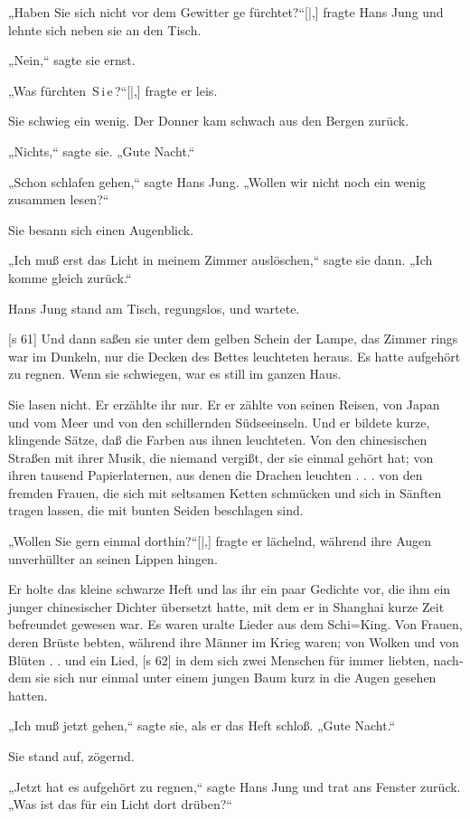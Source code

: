 „Haben Sie sich nicht vor dem Gewitter ge­
fürchtet?“[|,] fragte Hans Jung und lehnte sich neben
sie an den Tisch.

„Nein,“ sagte sie ernst.

„Was fürchten  S i e ?“[|,] fragte er leis.

Sie schwieg ein wenig. Der Donner kam schwach
aus den Bergen zurück.

„Nichts,“ sagte sie. „Gute Nacht.“

„Schon schlafen gehen,“ sagte Hans Jung.
„Wollen wir nicht noch ein wenig zusammen lesen?“

Sie besann sich einen Augenblick.

„Ich muß erst das Licht in meinem Zimmer
auslöschen,“ sagte sie dann. „Ich komme gleich
zurück.“

Hans Jung stand am Tisch, regungslos, und
wartete.

[s 61]
Und dann saßen sie unter dem gelben Schein
der Lampe, das Zimmer rings war im Dunkeln, nur
die Decken des Bettes leuchteten heraus. Es hatte
aufgehört zu regnen. Wenn sie schwiegen, war es
still im ganzen Haus.

Sie lasen nicht. Er erzählte ihr nur. Er er­
zählte von seinen Reisen, von Japan und vom Meer
und von den schillernden Südseeinseln. Und er
bildete kurze, klingende Sätze, daß die Farben aus
ihnen leuchteten. Von den chinesischen Straßen mit
ihrer Musik, die niemand vergißt, der sie einmal
gehört hat; von ihren tausend Papierlaternen, aus
denen die Drachen leuchten . . . von den fremden
Frauen, die sich mit seltsamen Ketten schmücken
und sich in Sänften tragen lassen, die mit bunten
Seiden beschlagen sind.

„Wollen Sie gern einmal dorthin?“[|,] fragte er
lächelnd, während ihre Augen unverhüllter an seinen
Lippen hingen.

Er holte das kleine schwarze Heft und las ihr
ein paar Gedichte vor, die ihm ein junger chinesischer
Dichter übersetzt hatte, mit dem er in Shanghai
kurze Zeit befreundet gewesen war. Es waren
uralte Lieder aus dem Schi=King. Von Frauen,
deren Brüste bebten, während ihre Männer im Krieg
waren; von Wolken und von Blüten . . und ein Lied,
[s 62]
in dem sich zwei Menschen für immer liebten, nach­
dem sie sich nur einmal unter einem jungen Baum
kurz in die Augen gesehen hatten.

„Ich muß jetzt gehen,“ sagte sie, als er das
Heft schloß. „Gute Nacht.“

Sie stand auf, zögernd.

„Jetzt hat es aufgehört zu regnen,“ sagte Hans
Jung und trat ans Fenster zurück. „Was ist das für
ein Licht dort drüben?“

